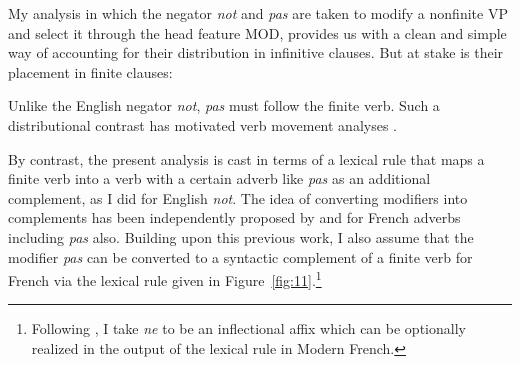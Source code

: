 \documentclass[output=paper]{langsci/langscibook}
\begin{document}
{\begin{exe}
\begin{xlist}
\begin{exe}
\begin{xlist}
My analysis in which the negator \emph{not} and \emph{pas} are taken
to modify a nonfinite VP and select it through the head feature
MOD, provides us with a clean and simple way of accounting for
their distribution in infinitive clauses. But at stake is
their placement in finite clauses:

\eal
{}
\zl

\eal
{}
\zl



\noindent
Unlike the English negator \emph{not}, \emph{pas} must follow the
finite verb. Such a distributional contrast has motivated verb
movement analyses \citep[see][]{Pollock:89,Zanuttini:01}.

By contrast, the present analysis is cast
in terms of a lexical rule that maps a finite verb into a verb
with a certain adverb like \emph{pas} as an additional complement, as
I did for English \emph{not}.  The idea of converting modifiers into
complements has been independently proposed by \citet{Miller92d-u} and
\citet{AG:94} for French adverbs including
\emph{pas} also.  Building upon this
previous work, I also assume that the modifier \emph{pas} can
be converted to a syntactic complement of a
finite verb for French via the lexical rule given
in Figure~\ref{fig:11}.\footnote{Following \citet{Miller92d-u}, I take \emph{ne} to
be an inflectional affix which can be optionally realized
in the output of the lexical rule in Modern French.}


\end{xlist}
\end{exe}
\end{xlist}
\end{exe}}
\end{document}
